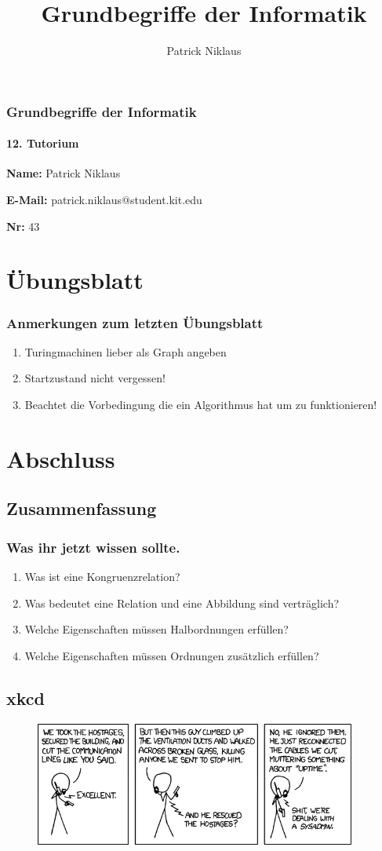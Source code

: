 \documentclass{beamer}
\title{Grundbegriffe der Informatik}
\author{Patrick Niklaus}
\begin{document}
\begin{frame}
  \frametitle{Grundbegriffe der Informatik}
  \framesubtitle{12. Tutorium}
  \begin{description}
    \item \textbf{Name:} Patrick Niklaus
    \item \textbf{E-Mail:} patrick.niklaus@student.kit.edu
    \item \textbf{Nr:} 43
  \end{description}
\end{frame}

\section{Übungsblatt}
\begin{frame}
  \frametitle{Anmerkungen zum letzten Übungsblatt}
  \begin{enumerate}
    \item Turingmachinen lieber als Graph angeben
    \item Startzustand nicht vergessen!
    \item Beachtet die Vorbedingung die ein Algorithmus hat um zu funktionieren!
  \end{enumerate}
\end{frame}





\section{Abschluss}
\subsection{Zusammenfassung}
\begin{frame}
  \frametitle{Was ihr jetzt wissen sollte.}
  \begin{enumerate}
    \item Was ist eine Kongruenzrelation?
    \item Was bedeutet eine Relation und eine Abbildung sind verträglich?
    \item Welche Eigenschaften müssen Halbordnungen erfüllen?
    \item Welche Eigenschaften müssen Ordnungen zusätzlich erfüllen?
  \end{enumerate}
\end{frame}

\subsection{xkcd}
\begin{frame}[plain]
  \begin{figure}
    \begin{center}
      \includegraphics[width=300pt]{devotion_to_duty}
    \end{center}
  \end{figure}
\end{frame}
\end{document}
